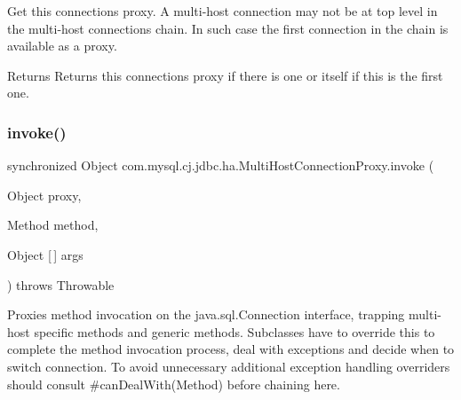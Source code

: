 Get this connection\textquotesingle{}s proxy. A multi-\/host connection may not be at top level in the multi-\/host connections chain. In such case the first connection in the chain is available as a proxy.

\begin{DoxyReturn}{Returns}
Returns this connection\textquotesingle{}s proxy if there is one or itself if this is the first one. 
\end{DoxyReturn}
\mbox{\label{classcom_1_1mysql_1_1cj_1_1jdbc_1_1ha_1_1_multi_host_connection_proxy_a1d1665c05d34a4382e804e44d4788084}} 
\subsubsection{\texorpdfstring{invoke()}{invoke()}}
{\footnotesize\ttfamily synchronized Object com.\+mysql.\+cj.\+jdbc.\+ha.\+Multi\+Host\+Connection\+Proxy.\+invoke (\begin{DoxyParamCaption}\item[{Object}]{proxy,  }\item[{Method}]{method,  }\item[{Object \mbox{[}$\,$\mbox{]}}]{args }\end{DoxyParamCaption}) throws Throwable}

Proxies method invocation on the java.\+sql.\+Connection interface, trapping multi-\/host specific methods and generic methods. Subclasses have to override this to complete the method invocation process, deal with exceptions and decide when to switch connection. To avoid unnecessary additional exception handling overriders should consult \#can\+Deal\+With(\+Method) before chaining here. \mbox{\label{classcom_1_1mysql_1_1cj_1_1jdbc_1_1ha_1_1_multi_host_connection_proxy_a290e636d680ff120338e9d781cbb33c1}} 
